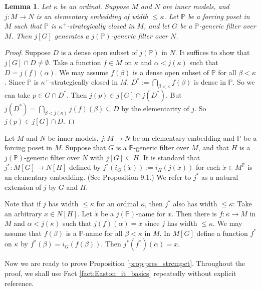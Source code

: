 \documentclass[a4paper,12pt,reqno,oneside]{amsart}
\theoremstyle{plain}
\newtheorem{lemma}[theorem]{Lemma}
\newcommand{\mbb}{\mathbb}
\begin{document}
\begin{lemma} \label{lem:width_generic}
Let $\kappa$ be an ordinal. Suppose $M$ and $N$ are inner models, and $j : M \to N$ is an elementary embedding of width $\leq \kappa$. Let $\mbb{P}$ be a forcing poset in $M$ such that $\mbb{P}$ is $\kappa^+$-strategically closed in $M$, and let $G$ be a $\mbb{P}$-generic filter over $M$. Then $j[G]$ generates a $j( \mbb{P} )$-generic filter over $N$.
\end{lemma}


\begin{proof}
Suppose $D$ is a dense open subset of $j( \mbb{P} )$ in $N$. It suffices to show that $j[G] \cap D \neq \emptyset$. Take a function $f \in M$ on $\kappa$ and $\alpha < j( \kappa )$ such that $D = j(f)( \alpha )$. We may assume $f( \beta )$ is a dense open subset of $\mbb{P}$ for all $\beta < \kappa$. Since $\mbb{P}$ is $\kappa^+$-strategically closed in $M$, $D^* := \bigcap_{\beta < \kappa} f( \beta )$ is dense in $\mbb{P}$. So we can take $p \in G \cap D^*$. Then $j(p) \in j[G] \cap j( D^* )$. But $j( D^* ) = \bigcap_{\beta < j( \kappa )} j(f)( \beta ) \subseteq D$ by the elementarity of $j$. So $j(p) \in j[G] \cap D$.
\end{proof}


Let $M$ and $N$ be inner models, $j : M \to N$ be an elementary embedding and $\mbb{P}$ be a forcing poset in $M$. Suppose that $G$ is a $\mbb{P}$-generic filter over $M$, and that $H$ is a $j( \mbb{P} )$-generic filter over $N$ with $j[G] \subseteq H$. It is standard that $j^* : M[G] \to N[H]$ defined by $j^* ( i_G ( \dot{x} ) ) := i_H ( j( \dot{x} ) )$ for each $\dot{x} \in M^\mbb{P}$ is an elementary embedding. (See \cite{C} Proposition 9.1.) We refer to $j^*$ as a natural extension of $j$ by $G$ and $H$. 

Note that if $j$ has width $\leq \kappa$ for an ordinal $\kappa$, then $j^*$ also has width $\leq \kappa$: Take an arbitrary $x \in N[H]$. Let $\dot{x}$ be a $j( \mbb{P} )$-name for $x$. Then there is $f : \kappa \to M$ in $M$ and $\alpha < j( \kappa )$ such that $j(f) ( \alpha ) = \dot{x}$ since $j$ has width $\leq \kappa$. We may assume that $f( \beta )$ is a $\mbb{P}$-name for all $\beta < \kappa$ in $M$. In $M[G]$ define a function $f^*$ on $\kappa$ by $f^* ( \beta ) = i_G ( f( \beta ) )$. Then $j^* ( f^* ) ( \alpha ) = x$.

Now we are ready to prove Proposition \ref{prop:pres_strcmpct}. Throughout the proof, we shall use Fact \ref{fact:Easton_it_basics} repeatedly without explicit reference.
\end{document}
